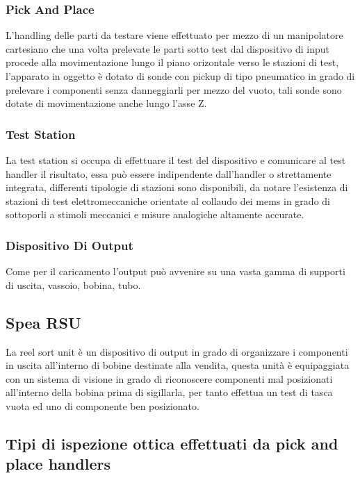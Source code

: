 \subsubsection{Pick And Place}

L’handling delle parti da testare viene effettuato per mezzo di un manipolatore cartesiano che una volta 
prelevate le parti sotto test dal dispositivo di input procede alla movimentazione lungo il piano orizontale verso le stazioni di test, l’apparato in oggetto è dotato di sonde con pickup di tipo pneumatico in grado di prelevare i componenti senza danneggiarli per mezzo del vuoto, tali sonde sono dotate di 
movimentazione anche lungo l’asse Z.  

\subsubsection{Test Station} 

La test station si occupa di effettuare il test del dispositivo e comunicare al test handler il risultato, essa può essere indipendente dall’handler o strettamente integrata, differenti tipologie di stazioni sono 
disponibili, da notare l’esistenza di stazioni di test elettromeccaniche orientate al collaudo dei mems in 
grado di sottoporli a stimoli meccanici e misure analogiche altamente accurate.  

\subsubsection{Dispositivo Di Output} 

Come per il caricamento l’output può avvenire su una vasta gamma di supporti di uscita, vassoio, bobina, 
tubo. 

\subsection{Spea RSU} 

La reel sort unit è un dispositivo di output in grado di organizzare i componenti in uscita all’interno di 
bobine destinate alla vendita, questa unità è equipaggiata con un sistema di visione in grado di 
riconoscere componenti mal posizionati all’interno della bobina prima di sigillarla, per  tanto effettua un 
test di tasca vuota ed uno di componente ben posizionato. 


\subsection{Tipi di ispezione ottica effettuati da pick and place handlers}
